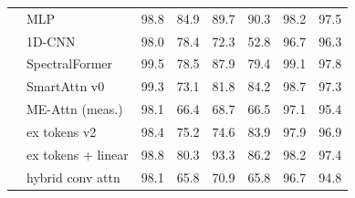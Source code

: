 \begin{tabular}{llcccccc}
 & MLP & 98.8 & 84.9 & 89.7 & 90.3 & 98.2 & 97.5 \\
 & 1D-CNN & 98.0 & 78.4 & 72.3 & 52.8 & 96.7 & 96.3 \\
 & SpectralFormer & 99.5 & 78.5 & 87.9 & 79.4 & 99.1 & 97.8 \\
 & SmartAttn v0 & 99.3 & 73.1 & 81.8 & 84.2 & 98.7 & 97.3 \\
 & ME-Attn (meas.) & 98.1 & 66.4 & 68.7 & 66.5 & 97.1 & 95.4 \\
 & ex tokens v2 & 98.4 & 75.2 & 74.6 & 83.9 & 97.9 & 96.9 \\
 & ex tokens + linear & 98.8 & 80.3 & 93.3 & 86.2 & 98.2 & 97.4 \\
 & hybrid conv attn & 98.1 & 65.8 & 70.9 & 65.8 & 96.7 & 94.8 \\
\bottomrule
\end{tabular}
